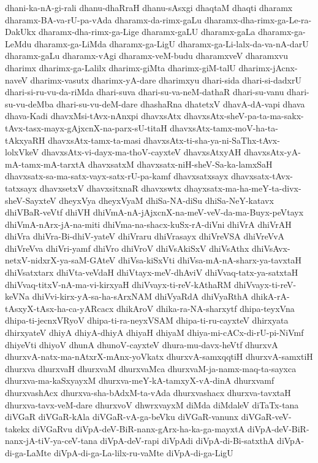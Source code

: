 {dhani-ka-nA-gi-rali
dhanu-dhaRraH
dhanu-sAsxgi
dhaqtaM
dhaqti
dharamx
dharamx-BA-va-rU-pa-vAda
dharamx-da-rimx-gaLu
dharamx-dha-rimx-ga-Le-ra-DakUkx
dharamx-dha-rimx-ga-Lige
dharamx-gaLU
dharamx-gaLa
dharamx-ga-LeMdu
dharamx-ga-LiMda
dharamx-ga-LigU
dharamx-ga-Li-lalx-da-va-nA-darU
dharamx-gaLu
dharamx-vAgi
dharamx-veM-budu
dharamxveV
dharamxvu
dharimx
dharimx-ga-Lalilx
dharimx-giMta
dharimx-giM-talU
dharimx-jAcnx-naveV
dharimx-vasutx
dharimx-yA-dare
dharimxyu
dhari-sida
dhari-si-dadxrU
dhari-si-ru-vu-da-riMda
dhari-suva
dhari-su-va-neM-dathaR
dhari-su-vanu
dhari-su-vu-deMba
dhari-su-vu-deM-dare
dhashaRna
dhatetxV
dhavA-dA-vapi
dhava
dhava-Kadi
dhavxMsi-tAvx-nAnxpi
dhavxsAtx
dhavxsAtx-sheV-pa-ta-ma-sakx-tAvx-tasx-mayx-gAjxcnX-na-parx-sU-titaH
dhavxsAtx-tamx-moV-ha-ta-tAkxyaRH
dhavxsAtx-tamx-ta-masi
dhavxsAtx-ti-sha-ya-ni-SaThx-tAvx-lolxVkeV
dhavxsAtx-vi-dayx-ma-thoV-cayxteV
dhavxsAtxyAH
dhavxsAtx-yA-mA-tamx-mA-tarxtA
dhavxsatxM
dhavxsatx-niH-sheV-Sa-ka-lamxSaH
dhavxsatx-sa-ma-satx-vayx-satx-rU-pa-kamf
dhavxsatxsayx
dhavxsatx-tAvx-tatxsayx
dhavxsetxV
dhavxsitxnaR
dhavxswtx
dhayxsatx-ma-ha-meY-ta-divx-sheV-SayxteV
dheyxVya
dheyxVyaM
dhiSa-NA-diSu
dhiSa-NeY-katavx
dhiVBaR-veVtf
dhiVH
dhiVmA-nA-jAjxcnX-na-meV-veV-da-ma-Buyx-peVtayx
dhiVmA-nArx-jA-na-miti
dhiVma-na-shacx-kuSx-rA-diVni
dhiVrA
dhiVrAH
dhiVra
dhiVra-Bi-dhiV-yateV
dhiVraru
dhiVrasayx
dhiVreVSA
dhiVreVvA
dhiVreVva
dhiVri-yamf
dhiVro
dhiVroV
dhiVsAkiSxV
dhiVsAthx
dhiVsAvx-netxV-nidxrX-ya-saM-GAteV
dhiVsa-kiSxVti
dhiVsa-mA-nA-sharx-ya-tavxtaH
dhiVsatxtarx
dhiVta-veVdaH
dhiVtayx-meV-dhAviV
dhiVvaq-tatx-ya-satxtaH
dhiVvaq-titxV-nA-ma-vi-kirxyaH
dhiVvayx-ti-reV-kAthaRM
dhiVvayx-ti-reV-keVNa
dhiVvi-kirx-yA-sa-ha-sArxNAM
dhiVyaRdA
dhiVyaRthA
dhikA-rA-tAsxyX-tAsx-ha-ca-yARcacx
dhikAroV
dhika-ra-NA-sharxytf
dhipa-teyxVna
dhipa-ti-jecnxVRyoV
dhipa-ti-ra-neyxVSAM
dhipa-ti-ru-cayxteV
dhirxyata
dhirxyateV
dhiyA
dhiyA-dhiyA
dhiyaH
dhiyaM
dhiya-mi-cACx-di-rU-pi-NiVmf
dhiyeVti
dhiyoV
dhunA
dhunoV-cayxteV
dhura-mu-davx-heVtf
dhurxvA
dhurxvA-natx-ma-nAtxrX-mAnx-yoVkatx
dhurxvA-samxqqtiH
dhurxvA-samxtiH
dhurxva
dhurxvaH
dhurxvaM
dhurxvaMca
dhurxvaM-ja-namx-maq-ta-sayxca
dhurxva-ma-kaSxyayxM
dhurxva-meY-kA-tamxyX-vA-dinA
dhurxvamf
dhurxvashAcx
dhurxva-sha-bAdxM-ta-vAda
dhurxvashacx
dhurxva-tavxtaH
dhurxva-tavx-veM-dare
dhurxvoV
dhwrxvayxM
diMda
diMdaleV
diTaTx-tana
diVGaR
diVGaR-kAla
diVGaR-vA-ga-beVku
diVGaR-vanunx
diVGaR-veV-takekx
diVGaRvu
diVpA-deV-BiR-nanx-gArx-ha-ka-ga-mayxtA
diVpA-deV-BiR-nanx-jA-tiV-ya-ceV-tana
diVpA-deV-rapi
diVpAdi
diVpA-di-Bi-satxthA
diVpA-di-ga-LaMte
diVpA-di-ga-La-lilx-ru-vaMte
diVpA-di-ga-LigU
}
